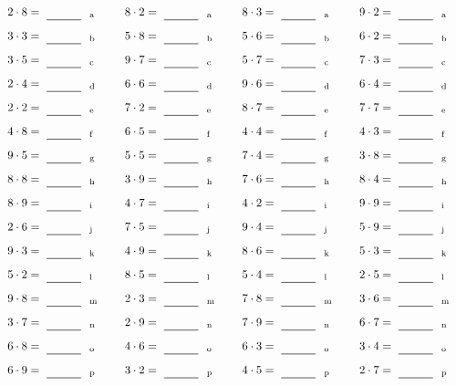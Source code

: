 \documentclass
[
  draft    = true,
  fontsize = 11pt,
  parskip  = half-
]
{scrartcl}
\begin{document}
\par\vfill\par
\begin{align*}
    \pline{2\cdot8}&=\rline{a}
  & \pline{8\cdot2}&=\rline{a}
  & \pline{8\cdot3}&=\rline{a}
  & \pline{9\cdot2}&=\rline{a} \\[1ex]
    \pline{3\cdot3}&=\rline{b}
  & \pline{5\cdot8}&=\rline{b}
  & \pline{5\cdot6}&=\rline{b}
  & \pline{6\cdot2}&=\rline{b} \\[1ex]
    \pline{3\cdot5}&=\rline{c}
  & \pline{9\cdot7}&=\rline{c}
  & \pline{5\cdot7}&=\rline{c}
  & \pline{7\cdot3}&=\rline{c} \\[1ex]
    \pline{2\cdot4}&=\rline{d}
  & \pline{6\cdot6}&=\rline{d}
  & \pline{9\cdot6}&=\rline{d}
  & \pline{6\cdot4}&=\rline{d} \\[1ex]
    \pline{2\cdot2}&=\rline{e}
  & \pline{7\cdot2}&=\rline{e}
  & \pline{8\cdot7}&=\rline{e}
  & \pline{7\cdot7}&=\rline{e} \\[1ex]
    \pline{4\cdot8}&=\rline{f}
  & \pline{6\cdot5}&=\rline{f}
  & \pline{4\cdot4}&=\rline{f}
  & \pline{4\cdot3}&=\rline{f} \\[1ex]
    \pline{9\cdot5}&=\rline{g}
  & \pline{5\cdot5}&=\rline{g}
  & \pline{7\cdot4}&=\rline{g}
  & \pline{3\cdot8}&=\rline{g} \\[1ex]
    \pline{8\cdot8}&=\rline{h}
  & \pline{3\cdot9}&=\rline{h}
  & \pline{7\cdot6}&=\rline{h}
  & \pline{8\cdot4}&=\rline{h} \\[1ex]
    \pline{8\cdot9}&=\rline{i}
  & \pline{4\cdot7}&=\rline{i}
  & \pline{4\cdot2}&=\rline{i}
  & \pline{9\cdot9}&=\rline{i} \\[1ex]
    \pline{2\cdot6}&=\rline{j}
  & \pline{7\cdot5}&=\rline{j}
  & \pline{9\cdot4}&=\rline{j}
  & \pline{5\cdot9}&=\rline{j} \\[1ex]
    \pline{9\cdot3}&=\rline{k}
  & \pline{4\cdot9}&=\rline{k}
  & \pline{8\cdot6}&=\rline{k}
  & \pline{5\cdot3}&=\rline{k} \\[1ex]
    \pline{5\cdot2}&=\rline{l}
  & \pline{8\cdot5}&=\rline{l}
  & \pline{5\cdot4}&=\rline{l}
  & \pline{2\cdot5}&=\rline{l} \\[1ex]
    \pline{9\cdot8}&=\rline{m}
  & \pline{2\cdot3}&=\rline{m}
  & \pline{7\cdot8}&=\rline{m}
  & \pline{3\cdot6}&=\rline{m} \\[1ex]
    \pline{3\cdot7}&=\rline{n}
  & \pline{2\cdot9}&=\rline{n}
  & \pline{7\cdot9}&=\rline{n}
  & \pline{6\cdot7}&=\rline{n} \\[1ex]
    \pline{6\cdot8}&=\rline{o}
  & \pline{4\cdot6}&=\rline{o}
  & \pline{6\cdot3}&=\rline{o}
  & \pline{3\cdot4}&=\rline{o} \\[1ex]
    \pline{6\cdot9}&=\rline{p}
  & \pline{3\cdot2}&=\rline{p}
  & \pline{4\cdot5}&=\rline{p}
  & \pline{2\cdot7}&=\rline{p}
\end{align*}
\end{document}
